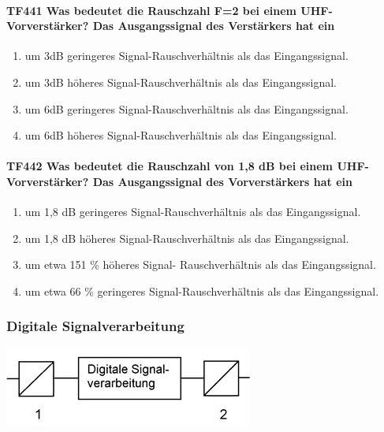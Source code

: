 \documentclass[8pt]{article}
\begin{document}
\paragraph*{TF441 Was bedeutet die Rauschzahl F=2 bei einem UHF-Vorverstärker? Das Ausgangssignal des Verstärkers hat ein}
\begin{enumerate}[nolistsep,label=\Alph*]
\item um 3dB geringeres Signal-Rauschverhältnis als das Eingangssignal.
\item um 3dB höheres Signal-Rauschverhältnis als das Eingangssignal.
\item um 6dB geringeres Signal-Rauschverhältnis als das Eingangssignal.
\item um 6dB höheres Signal-Rauschverhältnis als das Eingangssignal.
\end{enumerate}

\paragraph*{TF442 Was bedeutet die Rauschzahl von 1,8 dB bei einem UHF-Vorverstärker? Das Ausgangssignal des Vorverstärkers hat ein} 
\begin{enumerate}[nolistsep,label=\Alph*]
\item um 1,8 dB geringeres Signal-Rauschverhältnis als das Eingangssignal.
\item um 1,8 dB höheres Signal-Rauschverhältnis als das Eingangssignal.
\item um etwa 151 \% höheres Signal- Rauschverhältnis als das Eingangssignal.
\item um etwa 66 \% geringeres Signal-Rauschverhältnis als das Eingangssignal.
\end{enumerate}

\pagebreak
\subsubsection{Digitale Signalverarbeitung}
\begin{center}
	\begin{minipage}{\linewidth}
		\centering
		\includegraphics[scale=1.0]{pics/tf501_a.jpg}
	\end{minipage}
\end{center}
\end{document}
